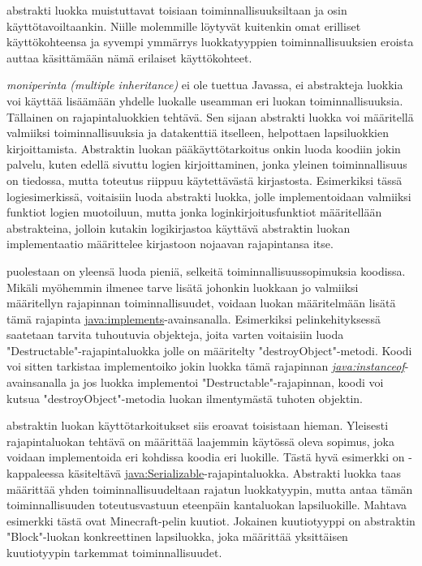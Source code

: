 \documentclass[a4paper,justified,notoc]{tufte-book}
\newcommand{\eng}[1]{\textit{(#1)}}
\newcommand{\new}[1]{\textit{\gls{#1}}}
\newcommand{\neweng}[2]{\new{#1} \eng{#2}}
\newcommand{\java}[1]{\underline{\gls{java:#1}}}
\newcommand{\newjava}[1]{\textit{\java{#1}}}
\begin{document}
\begin{fullwidth}
 abstrakti luokka muistuttavat toisiaan toiminnallisuuksiltaan ja
osin käyttötavoiltaankin. Niille molemmille löytyvät kuitenkin omat erilliset käyttökohteensa ja
syvempi ymmärrys luokkatyyppien toiminnallisuuksien eroista auttaa käsittämään nämä erilaiset
käyttökohteet.

 \neweng{moniperinta}{multiple inheritance} ei ole tuettua Javassa, ei
abstrakteja luokkia voi käyttää lisäämään yhdelle luokalle useamman eri luokan toiminnallisuuksia.
Tällainen on rajapintaluokkien tehtävä. Sen sijaan abstrakti luokka voi määritellä valmiiksi
toiminnallisuuksia ja datakenttiä itselleen, helpottaen lapsiluokkien kirjoittamista. Abstraktin
luokan pääkäyttötarkoitus onkin luoda koodiin jokin palvelu, kuten edellä sivuttu logien	
kirjoittaminen, jonka yleinen toiminnallisuus on tiedossa, mutta toteutus riippuu käytettävästä
kirjastosta. Esimerkiksi tässä logiesimerkissä, voitaisiin luoda abstrakti luokka, jolle
implementoidaan valmiiksi funktiot logien muotoiluun, mutta jonka loginkirjoitusfunktiot
määritellään abstrakteina, jolloin kutakin logikirjastoa käyttävä abstraktin luokan implementaatio
määrittelee kirjastoon nojaavan rajapintansa itse.

 puolestaan on yleensä luoda pieniä, selkeitä
toiminnallisuussopimuksia koodissa. Mikäli myöhemmin ilmenee tarve lisätä johonkin luokkaan jo
valmiiksi määritellyn rajapinnan toiminnallisuudet, voidaan luokan määritelmään lisätä tämä
rajapinta \java{implements}-avainsanalla. Esimerkiksi pelinkehityksessä saatetaan tarvita
tuhoutuvia objekteja, joita varten voitaisiin luoda "Destructable"-rajapintaluokka jolle on
määritelty "destroyObject"-metodi. Koodi voi sitten tarkistaa implementoiko jokin luokka tämä
rajapinnan \newjava{instanceof}-avainsanalla ja jos luokka implementoi "Destructable"-rajapinnan,
koodi voi kutsua "destroyObject"-metodia luokan ilmentymästä tuhoten objektin.

 abstraktin luokan käyttötarkoitukset siis eroavat toisistaan
hieman. Yleisesti rajapintaluokan tehtävä on määrittää laajemmin käytössä oleva sopimus, joka
voidaan implementoida eri kohdissa koodia eri luokille. Tästä hyvä esimerkki on
-kappaleessa käsiteltävä \java{Serializable}-rajapintaluokka. Abstrakti
luokka taas määrittää yhden toiminnallisuudeltaan rajatun luokkatyypin, mutta antaa tämän
toiminnallisuuden toteutusvastuun eteenpäin kantaluokan lapsiluokille. Mahtava esimerkki tästä
ovat Minecraft-pelin kuutiot. Jokainen kuutiotyyppi on abstraktin "Block"-luokan konkreettinen
lapsiluokka, joka määrittää yksittäisen kuutiotyypin tarkemmat toiminnallisuudet.


\end{fullwidth}
\end{document}
